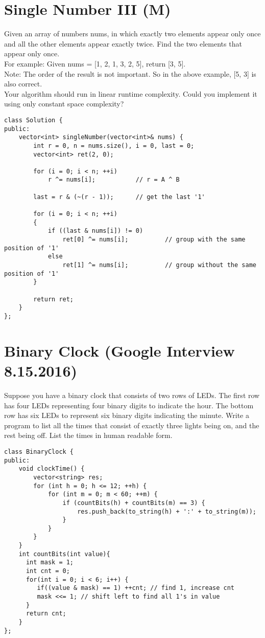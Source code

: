 \section{Single Number III (M)}
Given an array of numbers nums, in which exactly two elements appear only once and all the other elements appear exactly twice. Find the two elements that appear only once. \\

For example: Given nums = [1, 2, 1, 3, 2, 5], return [3, 5].\\

Note:
    The order of the result is not important. So in the above example, [5, 3] is also correct.\\
    Your algorithm should run in linear runtime complexity. Could you implement it using only constant space complexity?\\

\begin{lstlisting}
class Solution {
public:
    vector<int> singleNumber(vector<int>& nums) {
        int r = 0, n = nums.size(), i = 0, last = 0;
        vector<int> ret(2, 0);

        for (i = 0; i < n; ++i) 
            r ^= nums[i];           // r = A ^ B

        last = r & (~(r - 1));      // get the last '1'
        
        for (i = 0; i < n; ++i)
        {
            if ((last & nums[i]) != 0)
                ret[0] ^= nums[i];          // group with the same position of '1'
            else
                ret[1] ^= nums[i];          // group without the same position of '1'
        }

        return ret;
    }
};
\end{lstlisting}


\section{Binary Clock (Google Interview 8.15.2016)}
Suppose you have a binary clock that consists of two rows of LEDs. The first row has four LEDs representing four binary digits to indicate the hour. The bottom row has six LEDs to represent six binary digits indicating the minute. Write a program to list all the times that consist of exactly three lights being on, and the rest being off. List the times in human readable form.\\

\begin{lstlisting}
class BinaryClock {
public:
    void clockTime() {
        vector<string> res;
        for (int h = 0; h <= 12; ++h) {
            for (int m = 0; m < 60; ++m) {
                if (countBits(h) + countBits(m) == 3) {
                    res.push_back(to_string(h) + ':' + to_string(m));
                }
            }
        }
    }
    int countBits(int value){
      int mask = 1;
      int cnt = 0;
      for(int i = 0; i < 6; i++) {
         if((value & mask) == 1) ++cnt; // find 1, increase cnt
         mask <<= 1; // shift left to find all 1's in value
      }
      return cnt;       
    }
};
\end{lstlisting}

